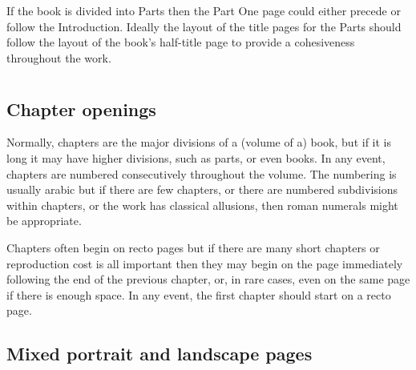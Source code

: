 \documentclass[10pt,a4paper,oneside,extrafontsizes]{memoir}%
\begin{document}
\begin{paracol}{2}
\switchEng
    If the book is divided into Parts then the Part One 
page could either precede or follow the 
Introduction. Ideally the layout of the title pages for the Parts should
follow the layout of the book's half-title page 
to provide a cohesiveness throughout the work.
\end{paracol}

\section{\prMainmatter}

\subsection{Chapter openings}

\begin{paracol}{2}
\switchEng
    Normally, chapters are the major divisions of a (volume of a) book, 
but if it is long
it may have higher divisions, such as parts, or even books. In any event,
chapters are numbered consecutively throughout the volume. The numbering
is usually arabic but if there are few chapters, or there are numbered
subdivisions within chapters, or the work has classical allusions, then
roman numerals might be appropriate.

    Chapters often begin on recto pages but if there are many short chapters
or reproduction cost is all important then they may begin on the page
immediately following the end of the previous chapter, or, in rare cases,
even on the same page if there is enough space. In any event, the first chapter
should start on a recto page.
\end{paracol}

\subsection{Mixed portrait and landscape pages}
\end{document}
